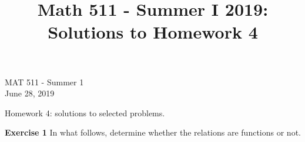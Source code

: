 \documentclass[12pt,oneside]{exam}
\title{Math 511 - Summer I 2019: Solutions to Homework 4}
\newenvironment{exercise}[1]{\vspace{.1in}\noindent\textbf{Exercise #1 \hspace{.05em}}}{}
\newcommand{\N}{\mathbb{N}}
\begin{document}
\begin{flushright}
\sc MAT 511 - Summer 1\\
June 28, 2019
\end{flushright}
\bigskip

\begin{center}
\textsf{Homework 4: solutions to selected problems.} 
\end{center}


\begin{exercise}{1}
In what follows, determine whether the relations are functions or not.
\end{exercise}
\end{document}
